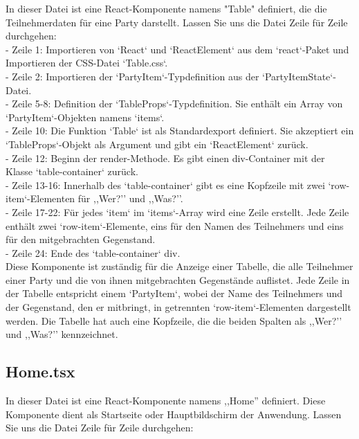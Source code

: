 \documentclass[./dokumentation.tex]{subfiles}
\begin{document}
In dieser Datei ist eine React-Komponente namens "Table" definiert, die die Teilnehmerdaten für eine Party darstellt. Lassen Sie uns die Datei Zeile für Zeile durchgehen:\\
- Zeile 1: Importieren von `React` und `ReactElement` aus dem `react`-Paket und Importieren der CSS-Datei `Table.css`. \\
- Zeile 2: Importieren der `PartyItem`-Typdefinition aus der `PartyItemState`-Datei.\\
- Zeile 5-8: Definition der `TableProps`-Typdefinition. Sie enthält ein Array von `PartyItem`-Objekten namens `items`.\\
- Zeile 10: Die Funktion `Table` ist als Standardexport definiert. Sie akzeptiert ein `TableProps`-Objekt als Argument und gibt ein `ReactElement` zurück.\\
- Zeile 12: Beginn der render-Methode. Es gibt einen div-Container mit der Klasse `table-container` zurück. \\
- Zeile 13-16: Innerhalb des `table-container` gibt es eine Kopfzeile mit zwei `row-item`-Elementen für ,,Wer?'' und ,,Was?''. \\
- Zeile 17-22: Für jedes `item` im `items`-Array wird eine Zeile erstellt. Jede Zeile enthält zwei `row-item`-Elemente, eins für den Namen des Teilnehmers und eins für den mitgebrachten Gegenstand. \\
- Zeile 24: Ende des `table-container` div.\\

Diese Komponente ist zuständig für die Anzeige einer Tabelle, die alle Teilnehmer einer Party und die von ihnen mitgebrachten Gegenstände auflistet. Jede Zeile in der Tabelle entspricht einem `PartyItem`, wobei der Name des Teilnehmers und der Gegenstand, den er mitbringt, in getrennten `row-item`-Elementen dargestellt werden. Die Tabelle hat auch eine Kopfzeile, die die beiden Spalten als ,,Wer?'' und ,,Was?'' kennzeichnet.


\subsection{Home.tsx}

In dieser Datei ist eine React-Komponente namens ,,Home'' definiert. Diese Komponente dient als Startseite oder Hauptbildschirm der Anwendung. Lassen Sie uns die Datei Zeile für Zeile durchgehen:\\
\end{document}
